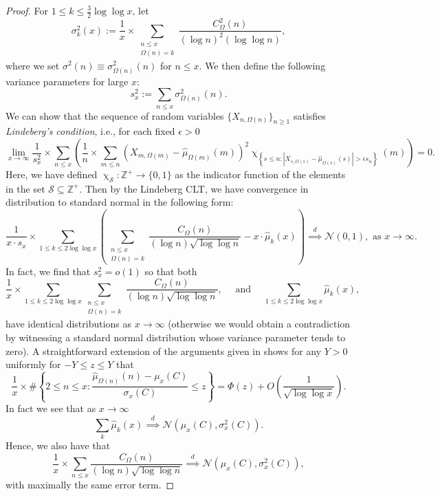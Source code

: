 \documentclass[11pt,reqno,a4letter]{article}
\numberwithin{figure}{section}
\numberwithin{table}{section}
\renewcommand{\chi}{\upchi}
\theoremstyle{plain}
\numberwithin{theorem}{section}
\theoremstyle{definition}
\begin{document}
\begin{proof}
For $1 \leq k \leq \frac{3}{2} \log\log x$, let 
\[
\sigma_k^2(x) := \frac{1}{x} \times \sum_{\substack{n \leq x \\ \Omega(n)=k}} 
     \frac{C_{\Omega}^2(n)}{(\log n)^2 (\log\log n)}, 
\]
where we set $\sigma^2(n) \equiv \sigma^2_{\Omega(n)}(n)$ for $n \leq x$. 
We then define the following variance parameters for large $x$: 
\[
s_x^2 := \sum_{n \leq x} \sigma_{\Omega(n)}^2(n). 
\]
We can show that the sequence of random variables $\{X_{n,\Omega(n)}\}_{n \geq 1}$ 
satisfies \emph{Lindeberg's condition}, i.e., for each fixed $\epsilon > 0$
\[
\lim_{x \rightarrow \infty} \frac{1}{s_x^2} \times \sum_{n \leq x} \left(\frac{1}{n} \times 
     \sum_{m \leq n} 
     (X_{m,\Omega(m)}-\widehat{\mu}_{\Omega(m)}(m))^2 
     \chi_{\left\{s \leq n: |X_{s,\Omega(s)}-\widehat{\mu}_{\Omega(s)}(s)| > \epsilon s_n\right\}}(m) 
     \right) = 0. 
\]
Here, we have defined $\chi_{\mathcal{S}}: \mathbb{Z}^{+} \rightarrow \{0,1\}$ as the 
indicator function of the elements in the set $\mathcal{S} \subseteq \mathbb{Z}^{+}$. 
Then by the Lindeberg CLT, we have convergence in distribution to standard normal in the following form:   
\[
\frac{1}{x \cdot s_x} \times \sum_{1 \leq k \leq 2\log\log x} \left( 
     \sum_{\substack{n \leq x \\ \Omega(n)=k}} \frac{C_{\Omega}(n)}{(\log n) \sqrt{\log\log n}} - 
     x \cdot \widehat{\mu}_k(x)\right) \overset{d}{\implies} \mathcal{N}(0, 1), 
     \text{ as } x \rightarrow \infty. 
\]
In fact, we find that $s_x^2 = o(1)$ so that both 
\[
\frac{1}{x} \times \sum_{1 \leq k \leq 2\log\log x} 
     \sum_{\substack{n \leq x \\ \Omega(n)=k}} \frac{C_{\Omega}(n)}{(\log n) \sqrt{\log\log n}}, 
     \quad \text{ and } \quad 
     \sum_{1 \leq k \leq 2\log\log x} \widehat{\mu}_k(x), 
\]
have identical distributions as $x \rightarrow \infty$ 
(otherwise we would obtain a contradiction by witnessing a 
standard normal distribution whose variance parameter tends to zero). 
A straightforward extension of the arguments given in 
\cite[Thm.~7.21; \S 7.4]{MV} shows for any $Y > 0$ uniformly for 
$-Y \leq z \leq Y$ that 
\[
\frac{1}{x} \times \#\left\{2 \leq n \leq x: 
     \frac{\widehat{\mu}_{\Omega(n)}(n) - \mu_x(C)}{\sigma_x(C)} \leq z\right\} 
     = \Phi(z) + O\left(\frac{1}{\sqrt{\log\log x}}\right). 
\]
In fact we see that as $x \rightarrow \infty$ 
\[
\sum_{k} \widehat{\mu}_k(x) \overset{d}{\implies} \mathcal{N}\left(\mu_x(C), \sigma_x^2(C)\right). 
\]
Hence, we also have that 
\[
\frac{1}{x} \times \sum_{n \leq x} \frac{C_{\Omega}(n)}{(\log n) \sqrt{\log\log n}}
     \overset{d}{\implies} \mathcal{N}\left(\mu_x(C), \sigma_x^2(C)\right), 
\]
with maximally the same error term. 
\end{proof}
\end{document}
